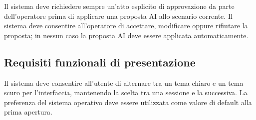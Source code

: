  \label{rf:ai_approvazione}
Il sistema deve richiedere sempre un'atto esplicito di approvazione da parte dell'operatore prima di applicare una proposta AI allo scenario corrente. Il sistema deve consentire all'operatore di accettare, modificare oppure rifiutare la proposta; in nessun caso la proposta AI deve essere applicata automaticamente.

\subsection{Requisiti funzionali di presentazione}

 \label{rf:tema}
Il sistema deve consentire all'utente di alternare tra un tema chiaro e un tema scuro per l'interfaccia, mantenendo la scelta tra una sessione e la successiva. La preferenza del sistema operativo deve essere utilizzata come valore di default alla prima apertura.